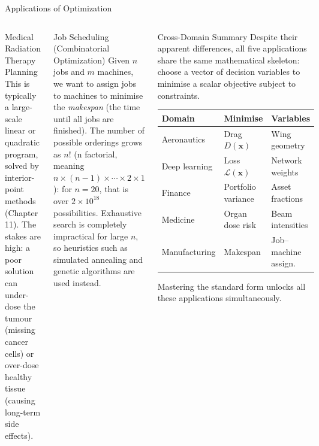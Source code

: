 \documentclass[aspectratio=169,10pt]{beamer}
\newcommand{\vx}{\mathbf{x}}
\begin{document}
\begin{frame}[allowframebreaks]{Applications of Optimization}
\begin{columns}[T]
\begin{block}{Medical Radiation Therapy Planning}
        \medskip
        This is typically a large-scale linear or quadratic program, solved by
        interior-point methods (Chapter 11).  The stakes are high: a poor
        solution can under-dose the tumour (missing cancer cells) or over-dose
        healthy tissue (causing long-term side effects).
      \end{block}

      \vspace{0.4em}

      \begin{block}{Job Scheduling (Combinatorial Optimization)}
        Given $n$ jobs and $m$ machines, we want to assign jobs to machines
        to minimise the \emph{makespan} (the time until all jobs are finished).
        The number of possible orderings grows as $n!$ (n factorial, meaning
        $n \times (n-1) \times \cdots \times 2 \times 1$): for $n = 20$, that
        is over $2 \times 10^{18}$ possibilities.  Exhaustive search is
        completely impractical for large $n$, so heuristics such as simulated
        annealing and genetic algorithms are used instead.
      \end{block}

      \begin{alertblock}{Cross-Domain Summary}
        Despite their apparent differences, all five applications share
        the same mathematical skeleton: choose a vector of decision variables
        to minimise a scalar objective subject to constraints.
        \medskip
        \centering
        \begin{tabular}{lll}
          \toprule
          \textbf{Domain} & \textbf{Minimise} & \textbf{Variables} \\
          \midrule
          Aeronautics   & Drag $D(\vx)$              & Wing geometry \\
          Deep learning & Loss $\mathcal{L}(\vx)$    & Network weights \\
          Finance       & Portfolio variance           & Asset fractions \\
          Medicine      & Organ dose risk              & Beam intensities \\
          Manufacturing & Makespan                    & Job--machine assign.\ \\
          \bottomrule
        \end{tabular}
        \medskip
        Mastering the standard form unlocks all these applications simultaneously.
      \end{alertblock}
  \end{columns}

\end{frame}
\end{document}
